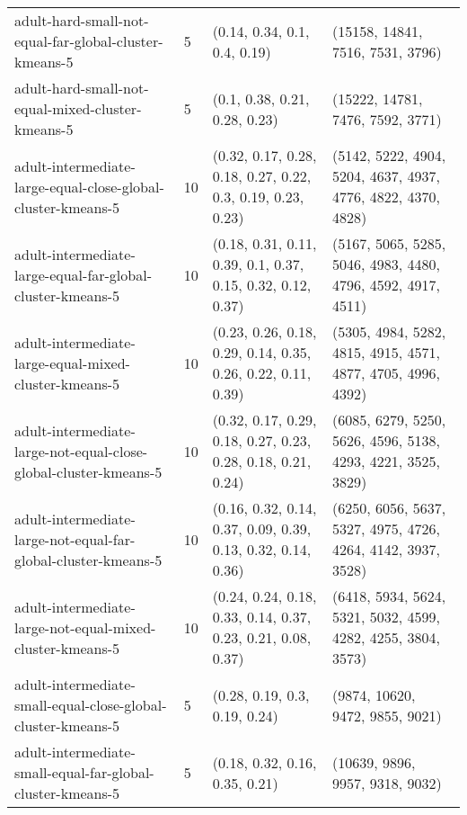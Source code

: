 \begin{longtable}{llll}
                                 adult-hard-small-not-equal-far-global-cluster-kmeans-5 &              5 &                                 (0.14, 0.34, 0.1, 0.4, 0.19) &                             (15158, 14841, 7516, 7531, 3796) \\
                                      adult-hard-small-not-equal-mixed-cluster-kmeans-5 &              5 &                                (0.1, 0.38, 0.21, 0.28, 0.23) &                             (15222, 14781, 7476, 7592, 3771) \\
                           adult-intermediate-large-equal-close-global-cluster-kmeans-5 &             10 &  (0.32, 0.17, 0.28, 0.18, 0.27, 0.22, 0.3, 0.19, 0.23, 0.23) & (5142, 5222, 4904, 5204, 4637, 4937, 4776, 4822, 4370, 4828) \\
                             adult-intermediate-large-equal-far-global-cluster-kmeans-5 &             10 &  (0.18, 0.31, 0.11, 0.39, 0.1, 0.37, 0.15, 0.32, 0.12, 0.37) & (5167, 5065, 5285, 5046, 4983, 4480, 4796, 4592, 4917, 4511) \\
                                  adult-intermediate-large-equal-mixed-cluster-kmeans-5 &             10 & (0.23, 0.26, 0.18, 0.29, 0.14, 0.35, 0.26, 0.22, 0.11, 0.39) & (5305, 4984, 5282, 4815, 4915, 4571, 4877, 4705, 4996, 4392) \\
                       adult-intermediate-large-not-equal-close-global-cluster-kmeans-5 &             10 & (0.32, 0.17, 0.29, 0.18, 0.27, 0.23, 0.28, 0.18, 0.21, 0.24) & (6085, 6279, 5250, 5626, 4596, 5138, 4293, 4221, 3525, 3829) \\
                         adult-intermediate-large-not-equal-far-global-cluster-kmeans-5 &             10 & (0.16, 0.32, 0.14, 0.37, 0.09, 0.39, 0.13, 0.32, 0.14, 0.36) & (6250, 6056, 5637, 5327, 4975, 4726, 4264, 4142, 3937, 3528) \\
                              adult-intermediate-large-not-equal-mixed-cluster-kmeans-5 &             10 & (0.24, 0.24, 0.18, 0.33, 0.14, 0.37, 0.23, 0.21, 0.08, 0.37) & (6418, 5934, 5624, 5321, 5032, 4599, 4282, 4255, 3804, 3573) \\
                           adult-intermediate-small-equal-close-global-cluster-kmeans-5 &              5 &                                (0.28, 0.19, 0.3, 0.19, 0.24) &                              (9874, 10620, 9472, 9855, 9021) \\
                             adult-intermediate-small-equal-far-global-cluster-kmeans-5 &              5 &                               (0.18, 0.32, 0.16, 0.35, 0.21) &                              (10639, 9896, 9957, 9318, 9032) \\

\end{longtable}
